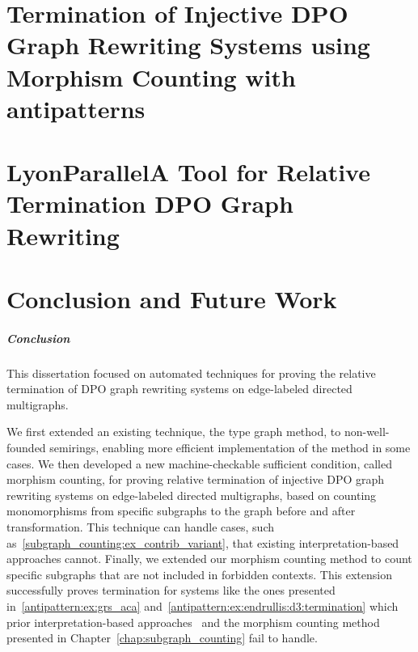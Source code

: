 \documentclass{report}
\begin{document}

\chapter{Termination of Injective DPO Graph Rewriting
Systems using Morphism Counting with antipatterns}
\label{chap:antipattern}
 


 
\chapter{LyonParallel\textemdash A Tool for Relative Termination DPO Graph Rewriting} 
\label{chap:lyonparallel}

\chapter{Conclusion and Future Work}
\paragraph{Conclusion}
This dissertation focused on automated techniques for proving the relative termination of DPO graph rewriting systems on edge-labeled directed multigraphs.

We first extended an existing technique, the type graph method, to non-well-founded semirings, enabling more efficient implementation of the method in some cases.
We then developed a new machine-checkable sufficient condition, called morphism counting, for proving relative termination of injective DPO graph rewriting systems on edge-labeled directed multigraphs, based on counting monomorphisms from specific subgraphs to the graph before and after transformation. This technique can handle cases, such as~\autoref{subgraph_counting:ex_contrib_variant}, that existing interpretation-based approaches cannot.
Finally, we extended our morphism counting method to count specific subgraphs that are not included in forbidden contexts. This extension successfully proves termination for systems like the ones presented
in~\autoref{antipattern:ex:grs_aca} and~\autoref{antipattern:ex:endrullis:d3:termination} which prior interpretation-based approaches~\cite{zantema2014termination,bruggink2014termination,bruggink2015proving,endrullis2024generalized_arxiv_v2,overbeek2024termination_lmcs} and the morphism counting method presented in Chapter~\ref{chap:subgraph_counting} fail to handle.
\end{document}
